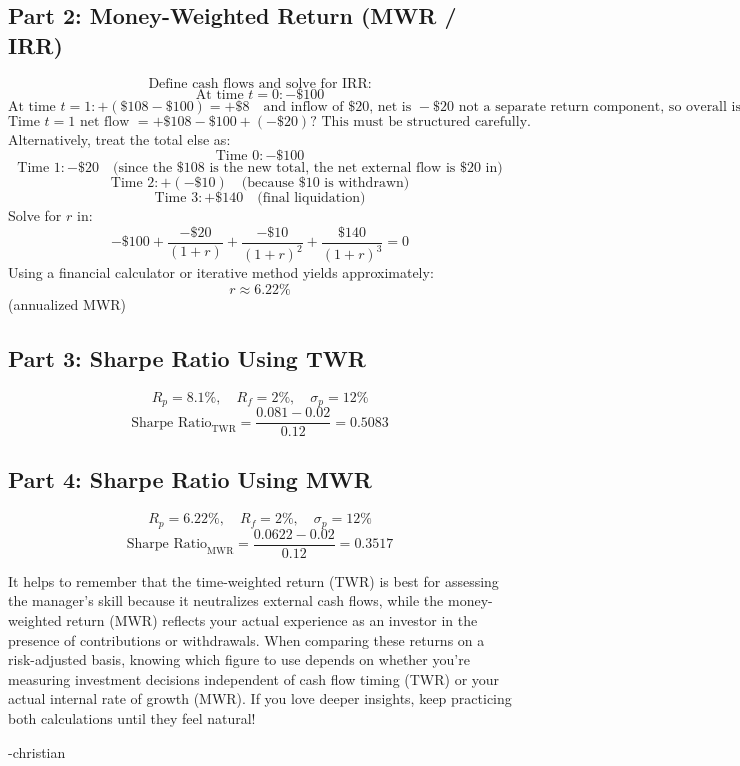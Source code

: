 \subsection*{Part 2: Money-Weighted Return (MWR / IRR)}
\[
\text{Define cash flows and solve for IRR:}
\]
\[
\text{At time }t=0: -\$100
\]
\[
\text{At time }t=1: +(\$108 - \$100) = +\$8 \quad \text{and inflow of \$20, net is } -\$20 \text{ not a separate return component, so overall is }
\]
\[
\text{Time }t=1 \text{ net flow }= +\$108 - \$100 + (-\$20)\text{? This must be structured carefully.}
\]
Alternatively, treat the total else as:
\[
\text{Time }0: -\$100
\]
\[
\text{Time }1: -\$20 \quad \text{(since the \$108 is the new total, the net external flow is \$20 in)}
\]
\[
\text{Time }2: +(-\$10) \quad \text{(because \$10 is withdrawn)}
\]
\[
\text{Time }3: +\$140 \quad \text{(final liquidation)}
\]
Solve for \(r\) in:
\[
-\$100 + \frac{-\$20}{(1+r)} + \frac{-\$10}{(1+r)^2} + \frac{\$140}{(1+r)^3} = 0
\]
Using a financial calculator or iterative method yields approximately:
\[
r \approx 6.22\%
\]
(annualized MWR)

\subsection*{Part 3: Sharpe Ratio Using TWR}
\[
R_p = 8.1\%, \quad R_f = 2\%, \quad \sigma_p = 12\%
\]
\[
\text{Sharpe Ratio}_{\text{TWR}} = \frac{0.081 - 0.02}{0.12} = 0.5083
\]

\subsection*{Part 4: Sharpe Ratio Using MWR}
\[
R_p = 6.22\%, \quad R_f = 2\%, \quad \sigma_p = 12\%
\]
\[
\text{Sharpe Ratio}_{\text{MWR}} = \frac{0.0622 - 0.02}{0.12} = 0.3517
\]

\begin{infobox}

It helps to remember that the time-weighted return (TWR) is best for assessing the manager's skill because it neutralizes external cash flows, while the money-weighted return (MWR) reflects your actual experience as an investor in the presence of contributions or withdrawals. When comparing these returns on a risk-adjusted basis, knowing which figure to use depends on whether you're measuring investment decisions independent of cash flow timing (TWR) or your actual internal rate of growth (MWR). If you love deeper insights, keep practicing both calculations until they feel natural!

-christian

\end{infobox}